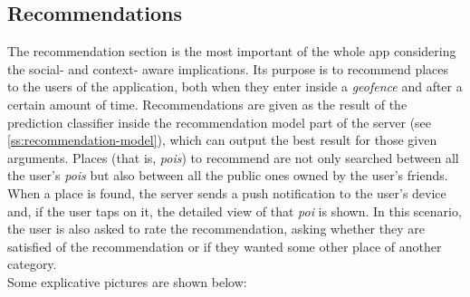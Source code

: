 \documentclass[../../main]{subfiles}
\begin{document}
\subsection{Recommendations}
\label{ss:final-recommendations}

The recommendation section is the most important of the whole app considering the social- and context- aware implications.
Its purpose is to recommend places to the users of the application, both when they enter inside a \textit{geofence} and after a certain amount of time.
Recommendations are given as the result of the prediction classifier inside the recommendation model part of the server (see \ref{ss:recommendation-model}), which can output the best result for those given arguments. 
Places (that is, \textit{pois}) to recommend are not only searched between all the user's \textit{pois} but also between all the public ones owned by the user's friends.
When a place is found, the server sends a push notification to the user's device and, if the user taps on it, the detailed view of that \textit{poi} is shown.
In this scenario, the user is also asked to rate the recommendation, asking whether they are satisfied of the recommendation or if they wanted some other place of another category.\\
Some explicative pictures are shown below:
\end{document}
